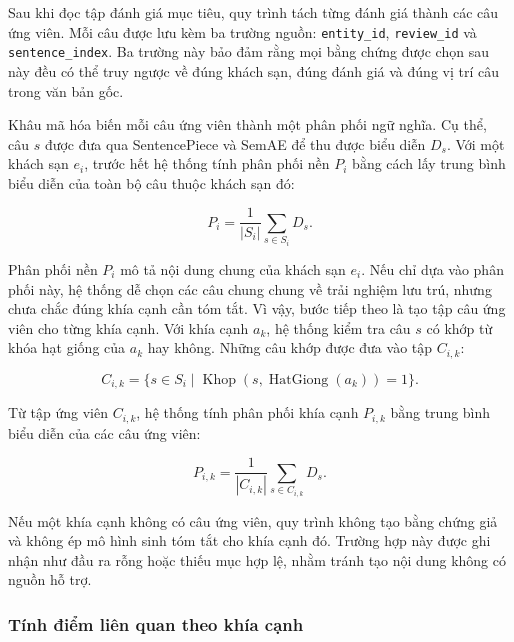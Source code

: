 Sau khi đọc tập đánh giá mục tiêu, quy trình tách từng đánh giá thành các câu ứng viên. Mỗi câu được lưu kèm ba trường nguồn: \texttt{entity\_id}, \texttt{review\_id} và \texttt{sentence\_index}. Ba trường này bảo đảm rằng mọi bằng chứng được chọn sau này đều có thể truy ngược về đúng khách sạn, đúng đánh giá và đúng vị trí câu trong văn bản gốc.

Khâu mã hóa biến mỗi câu ứng viên thành một phân phối ngữ nghĩa. Cụ thể, câu \(s\) được đưa qua SentencePiece và SemAE để thu được biểu diễn \(D_s\). Với một khách sạn \(e_i\), trước hết hệ thống tính phân phối nền \(P_i\) bằng cách lấy trung bình biểu diễn của toàn bộ câu thuộc khách sạn đó:

\begin{equation}
P_i = \frac{1}{|S_i|}\sum_{s\in S_i}D_s.
\label{eq:method2-background-distribution}
\end{equation}

Phân phối nền \(P_i\) mô tả nội dung chung của khách sạn \(e_i\). Nếu chỉ dựa vào phân phối này, hệ thống dễ chọn các câu chung chung về trải nghiệm lưu trú, nhưng chưa chắc đúng khía cạnh cần tóm tắt. Vì vậy, bước tiếp theo là tạo tập câu ứng viên cho từng khía cạnh. Với khía cạnh \(a_k\), hệ thống kiểm tra câu \(s\) có khớp từ khóa hạt giống của \(a_k\) hay không. Những câu khớp được đưa vào tập \(C_{i,k}\):

\begin{equation}
C_{i,k}=\{s\in S_i \mid \operatorname{Khop}(s,\operatorname{HatGiong}(a_k))=1\}.
\label{eq:method2-candidate-set}
\end{equation}

Từ tập ứng viên \(C_{i,k}\), hệ thống tính phân phối khía cạnh \(P_{i,k}\) bằng trung bình biểu diễn của các câu ứng viên:

\begin{equation}
P_{i,k}=\frac{1}{|C_{i,k}|}\sum_{s\in C_{i,k}}D_s.
\label{eq:method2-aspect-distribution}
\end{equation}

Nếu một khía cạnh không có câu ứng viên, quy trình không tạo bằng chứng giả và không ép mô hình sinh tóm tắt cho khía cạnh đó. Trường hợp này được ghi nhận như đầu ra rỗng hoặc thiếu mục hợp lệ, nhằm tránh tạo nội dung không có nguồn hỗ trợ.

\subsubsection{Tính điểm liên quan theo khía cạnh}
\label{subsubsec:method2-aspect-scoring}

